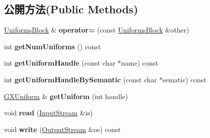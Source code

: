 \subsection*{公開方法(Public Methods)}
\begin{DoxyCompactItemize}
\item 
\hyperlink{class_magnum_1_1_uniforms_block}{Uniforms\+Block} \& {\bfseries operator=} (const \hyperlink{class_magnum_1_1_uniforms_block}{Uniforms\+Block} \&other)\hypertarget{class_magnum_1_1_uniforms_block_a17c7aa1f0e3d8f5a6a35da5ee2e08d74}{}\label{class_magnum_1_1_uniforms_block_a17c7aa1f0e3d8f5a6a35da5ee2e08d74}

\item 
int {\bfseries get\+Num\+Uniforms} () const \hypertarget{class_magnum_1_1_uniforms_block_a83087cbc5efdd428ae38fa583b6661c3}{}\label{class_magnum_1_1_uniforms_block_a83087cbc5efdd428ae38fa583b6661c3}

\item 
int {\bfseries get\+Uniform\+Handle} (const char $\ast$name) const \hypertarget{class_magnum_1_1_uniforms_block_a0dea4301536ec2e35ea63e297dc88044}{}\label{class_magnum_1_1_uniforms_block_a0dea4301536ec2e35ea63e297dc88044}

\item 
int {\bfseries get\+Uniform\+Handle\+By\+Semantic} (const char $\ast$sematic) const \hypertarget{class_magnum_1_1_uniforms_block_a1f181f90284693d6741c7c3a422e6a09}{}\label{class_magnum_1_1_uniforms_block_a1f181f90284693d6741c7c3a422e6a09}

\item 
\hyperlink{class_magnum_1_1_g_x_uniform}{G\+X\+Uniform} \& {\bfseries get\+Uniform} (int handle)\hypertarget{class_magnum_1_1_uniforms_block_a5dcfce65c3f94a745fb0376afdd82e72}{}\label{class_magnum_1_1_uniforms_block_a5dcfce65c3f94a745fb0376afdd82e72}

\item 
void {\bfseries read} (\hyperlink{class_magnum_1_1_input_stream}{Input\+Stream} \&is)\hypertarget{class_magnum_1_1_uniforms_block_aabdfa44aa384fac8980a86dca5a8a729}{}\label{class_magnum_1_1_uniforms_block_aabdfa44aa384fac8980a86dca5a8a729}

\item 
void {\bfseries write} (\hyperlink{class_magnum_1_1_output_stream}{Output\+Stream} \&os) const \hypertarget{class_magnum_1_1_uniforms_block_aeade20ddba4399d4353ba098bab09b10}{}\label{class_magnum_1_1_uniforms_block_aeade20ddba4399d4353ba098bab09b10}

\end{DoxyCompactItemize}
